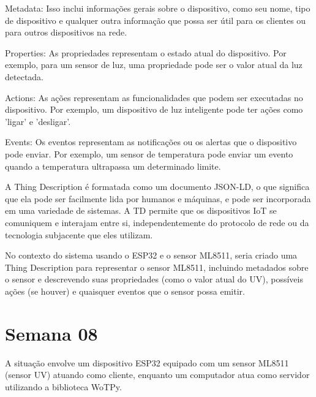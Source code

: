 Metadata: Isso inclui informações gerais sobre o dispositivo, como seu nome, tipo de dispositivo e qualquer outra informação que possa ser útil para os clientes ou para outros dispositivos na rede.

Properties: As propriedades representam o estado atual do dispositivo. Por exemplo, para um sensor de luz, uma propriedade pode ser o valor atual da luz detectada.

Actions: As ações representam as funcionalidades que podem ser executadas no dispositivo. Por exemplo, um dispositivo de luz inteligente pode ter ações como 'ligar' e 'desligar'.

Events: Os eventos representam as notificações ou os alertas que o dispositivo pode enviar. Por exemplo, um sensor de temperatura pode enviar um evento quando a temperatura ultrapassa um determinado limite.

A Thing Description é formatada como um documento JSON-LD, o que significa que ela pode ser facilmente lida por humanos e máquinas, e pode ser incorporada em uma variedade de sistemas. A TD permite que os dispositivos IoT se comuniquem e interajam entre si, independentemente do protocolo de rede ou da tecnologia subjacente que eles utilizam.

No contexto do sistema usando o ESP32 e o sensor ML8511, seria criado uma Thing Description para representar o sensor ML8511, incluindo metadados sobre o sensor e descrevendo suas propriedades (como o valor atual do UV), possíveis ações (se houver) e quaisquer eventos que o sensor possa emitir.

\section{Semana 08}

A situação envolve um dispositivo ESP32 equipado com um sensor ML8511 (sensor UV) atuando como cliente, enquanto um computador atua como servidor utilizando a biblioteca WoTPy. 

